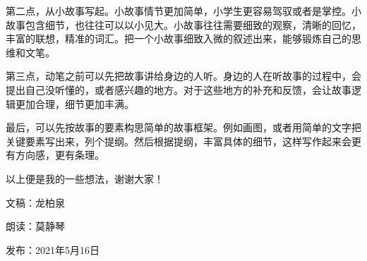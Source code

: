 第二点，从小故事写起。小故事情节更加简单，小学生更容易驾驭或者是掌控。小故事包含细节，也往往可以以小见大。小故事往往需要细致的观察，清晰的回忆，丰富的联想，精准的词汇。把一个小故事细致入微的叙述出来，能够锻炼自己的思维和文笔。



第三点，动笔之前可以先把故事讲给身边的人听。身边的人在听故事的过程中，会提出自己没听懂的，或者感兴趣的地方。对于这些地方的补充和反馈，会让故事逻辑更加合理，细节更加丰满。



最后，可以先按故事的要素构思简单的故事框架。例如画图，或者用简单的文字把关键要素写出来，列个提纲。然后根据提纲，丰富具体的细节，这样写作起来会更有方向感，更有条理。







以上便是我的一些想法，谢谢大家！

\vspace{10pt}

文稿：龙柏泉

朗读：莫静琴

发布：2021年5月16日








\vspace{10pt}

\hline

